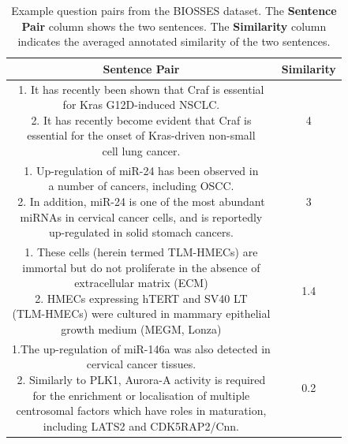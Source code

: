 \begin{enumerate}
	
	\begin{table}[ht!]
		\centering
			\begin{tabular}{c|c}
				\hline
				\multicolumn{1}{c|}{\textbf{Sentence Pair}} & 
				\multicolumn{1}{c}{\textbf{Similarity}}  \\
				\hline
				\makecell[l]{1. It has recently been shown that Craf is essential \\ for Kras G12D-induced NSCLC. \\ 
					2. It has recently become evident that Craf is \\ essential for the onset of Kras-driven non-small \\ cell lung cancer.} & 4  \\
				\hline
				\makecell[l]{1. Up-regulation of miR-24 has been observed in \\ a number of cancers, including OSCC. \\ 
					2. In addition, miR-24 is one of the most abundant \\ miRNAs in cervical cancer cells, and is reportedly \\ up-regulated in solid stomach cancers. } & 3 \\
				\hline
				\makecell[l]{1. These cells (herein termed TLM-HMECs) are \\ immortal but do not proliferate in the absence of \\ extracellular matrix (ECM) \\  
					2. HMECs expressing hTERT and SV40 LT \\ (TLM-HMECs) were cultured in mammary epithelial \\ growth medium (MEGM, Lonza)  } & 1.4  \\
				\hline
				\makecell[l]{1.The up-regulation of miR-146a was also detected in \\ cervical cancer tissues.  \\ 
					2. Similarly to PLK1, Aurora-A activity is required \\ for the enrichment or localisation of multiple \\ centrosomal  factors which have roles in maturation, \\ including LATS2 and CDK5RAP2/Cnn.} & 0.2  \\
				\hline               
			\end{tabular}
		\caption[Example question pairs from the BIOSSES dataset]{Example question  pairs from the BIOSSES dataset. The \textbf{Sentence Pair} column shows the two sentences. The \textbf{Similarity} column indicates the averaged annotated similarity of the two sentences.}
		\label{tab:biomeddata}
	\end{table} 


\end{enumerate}
